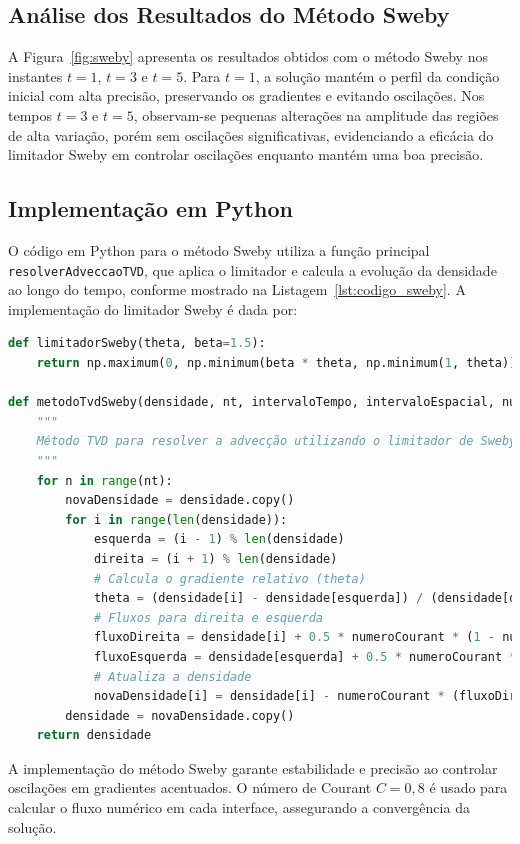 \begin{table}[H]
    \centering
    
    \caption{Tabela de resultados para o método Sweby nas posições espaciais selecionadas e diferentes tempos.}
    \label{tab:sweby}
\end{table}

\subsection{Análise dos Resultados do Método Sweby}

A Figura~\ref{fig:sweby} apresenta os resultados obtidos com o método Sweby nos instantes \(t=1\), \(t=3\) e \(t=5\). Para \(t=1\), a solução mantém o perfil da condição inicial com alta precisão, preservando os gradientes e evitando oscilações. Nos tempos \(t=3\) e \(t=5\), observam-se pequenas alterações na amplitude das regiões de alta variação, porém sem oscilações significativas, evidenciando a eficácia do limitador Sweby em controlar oscilações enquanto mantém uma boa precisão.

\subsection{Implementação em Python}

O código em Python para o método Sweby utiliza a função principal \texttt{resolverAdveccaoTVD}, que aplica o limitador e calcula a evolução da densidade ao longo do tempo, conforme mostrado na Listagem~\ref{lst:codigo_sweby}. A implementação do limitador Sweby é dada por:

\begin{lstlisting}[language=Python, caption={Código para resolver a advecção usando o método Sweby}, label={lst:codigo_sweby}]
def limitadorSweby(theta, beta=1.5):
    return np.maximum(0, np.minimum(beta * theta, np.minimum(1, theta)))

def metodoTvdSweby(densidade, nt, intervaloTempo, intervaloEspacial, numeroCourant):
    """
    Método TVD para resolver a advecção utilizando o limitador de Sweby.
    """
    for n in range(nt):
        novaDensidade = densidade.copy()
        for i in range(len(densidade)):
            esquerda = (i - 1) % len(densidade)
            direita = (i + 1) % len(densidade)
            # Calcula o gradiente relativo (theta)
            theta = (densidade[i] - densidade[esquerda]) / (densidade[direita] - densidade[i] + 1e-6)
            # Fluxos para direita e esquerda
            fluxoDireita = densidade[i] + 0.5 * numeroCourant * (1 - numeroCourant) * limitadorSweby(theta) * (densidade[direita] - densidade[i])
            fluxoEsquerda = densidade[esquerda] + 0.5 * numeroCourant * (1 - numeroCourant) * limitadorSweby(theta) * (densidade[i] - densidade[esquerda])
            # Atualiza a densidade
            novaDensidade[i] = densidade[i] - numeroCourant * (fluxoDireita - fluxoEsquerda)
        densidade = novaDensidade.copy()
    return densidade
\end{lstlisting}

A implementação do método Sweby garante estabilidade e precisão ao controlar oscilações em gradientes acentuados. O número de Courant \(C=0,8\) é usado para calcular o fluxo numérico em cada interface, assegurando a convergência da solução.
